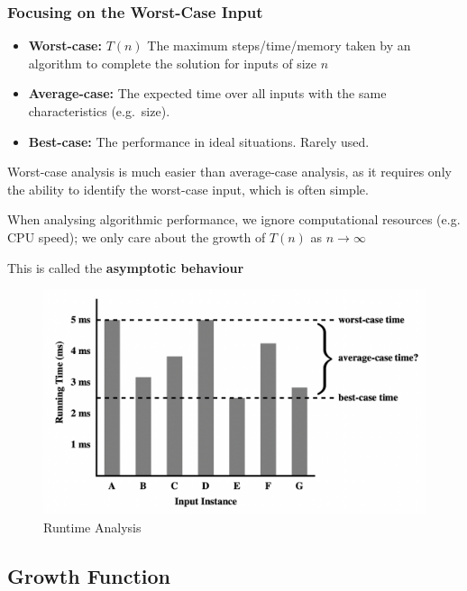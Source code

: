 \documentclass[11pt]{article}
\begin{document}
    \hypertarget{focusing-on-the-worst-case-input}{%
\subsubsection{Focusing on the Worst-Case
Input}\label{focusing-on-the-worst-case-input}}

\begin{itemize}
\item
  \textbf{Worst-case:} \(T(n)\) The maximum steps/time/memory taken by
  an algorithm to complete the solution for inputs of size \(n\)
\item
  \textbf{Average-case:} The expected time over all inputs with the same
  characteristics (e.g.~size).
\item
  \textbf{Best-case:} The performance in ideal situations. Rarely used.
\end{itemize}

Worst-case analysis is much easier than average-case analysis, as it
requires only the ability to identify the worst-case input, which is
often simple.

When analysing algorithmic performance, we ignore computational
resources (e.g. CPU speed); we only care about the growth of \(T(n)\) as
\(n \rightarrow \infty\)

This is called the \textbf{asymptotic behaviour}

    \begin{figure}
\centering
\includegraphics{fig3.2.png}
\caption{Runtime Analysis}
\end{figure}

    \hypertarget{growth-function}{%
\subsection{Growth Function}\label{growth-function}}
\end{document}
